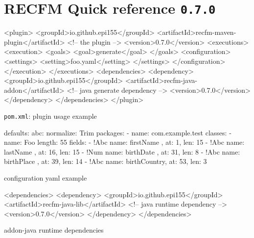 \documentclass[a4paper,10pt]{article}
\newenvironment{elisting}[1][H]
  {\captionsetup{aboveskip=0pt}\begin{listing}[#1]}
  {\end{listing}%
}
\begin{document}
\section*{RECFM Quick reference \quad \texttt{0.7.0}}

\vspace*{-10pt}

\begin{elisting}%
\begin{xmlcode}
<plugin>
    <groupId>io.github.epi155</groupId>
    <artifactId>recfm-maven-plugin</artifactId>  <!-- the plugin -->
    <version>0.7.0</version>
    <executions>
        <execution>
            <goals>
                <goal>generate</goal>
            </goals>
            <configuration>
                <settings>
                    <setting>foo.yaml</setting>
                </settings>
            </configuration>
        </execution>
    </executions>
    <dependencies>
        <dependency>
            <groupId>io.github.epi155</groupId>
            <artifactId>recfm-java-addon</artifactId>  <!-- java generate dependency -->
            <version>0.7.0</version>
        </dependency>
    </dependencies>
</plugin>
\end{xmlcode}
\caption{\texttt{pom.xml}: plugin usage example}
\end{elisting}

\vspace*{-25pt}

\begin{elisting}%
\begin{yamlcode}
defaults:
  abc:
    normalize: Trim
packages:
  - name: com.example.test
    classes:
      - name: Foo
        length: 55
        fields:
          - !Abc { name: firstName   , at:  1, len: 15 }
          - !Abc { name: lastName    , at: 16, len: 15 }
          - !Num { name: birthDate   , at: 31, len:  8 }
          - !Abc { name: birthPlace  , at: 39, len: 14 }
          - !Abc { name: birthCountry, at: 53, len:  3 }
\end{yamlcode}
\caption{configuration yaml example}
\end{elisting}

\vspace*{-25pt}

\begin{elisting}%
\begin{xmlcode}
<dependencies>
  <dependency>
    <groupId>io.github.epi155</groupId>
    <artifactId>recfm-java-lib</artifactId>  <!-- java runtime dependency -->
    <version>0.7.0</version>
  </dependency>
</dependencies>
\end{xmlcode}
\caption{addon-java runtime dependencies}
\end{elisting}
\end{document}
